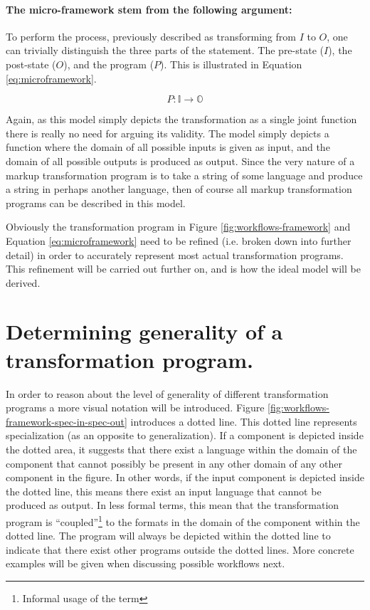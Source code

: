 \documentclass{scrreprt}
\begin{document}
\paragraph{The micro-framework stem from the following argument: } To perform the process, previously described as transforming from $I$ to $O$, one can trivially distinguish the three parts of the statement. The pre-state ($I$), the post-state ($O$), and the program ($P$). This is illustrated in Equation \ref{eq:microframework}.

\begin{equation}
  P : \mathbb{I} \rightarrow \mathbb{O}
  \label{eq:microframework}
\end{equation}

Again, as this model simply depicts the transformation as a single joint function there is really no need for arguing its validity. The model simply depicts a function where the domain of all possible inputs is given as input, and the domain of all possible outputs is produced as output. Since the very nature of a markup transformation program is to take a string of some language and produce a string in perhaps another language, then of course all markup transformation programs can be described in this model.


Obviously the transformation program in Figure \ref{fig:workflows-framework} and Equation \ref{eq:microframework} need to be refined (i.e. broken down into further detail) in order to accurately represent most actual transformation programs. This refinement will be carried out further on, and is how the ideal model will be derived.



\section{Determining generality of a transformation program.}
In order to reason about the level of generality of different transformation programs a more visual notation will be introduced. Figure \ref{fig:workflows-framework-spec-in-spec-out} introduces  a dotted line. This dotted line represents specialization (as an opposite to generalization). If a component is depicted inside the dotted area, it suggests that there exist a language within the domain of the component that cannot possibly be present in any other domain of any other component in the figure. In other words, if the input component is depicted inside the dotted line, this means there exist an input language that cannot be produced as output. In less formal terms, this mean that the transformation program is ``coupled''\footnote{Informal usage of the term} to the formats in the domain of the component within the dotted line. The program will always be depicted within the dotted line to indicate that there exist other programs outside the dotted lines. More concrete examples will be given when discussing possible workflows next.
\end{document}
